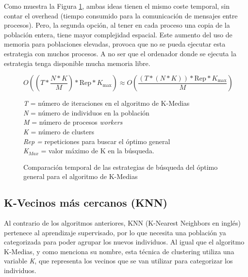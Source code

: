 		Como muestra la Figura \ref{fig:KMedias_comp}, ambas ideas tienen el mismo coste temporal, sin contar el overhead (tiempo consumido para la comunicación de mensajes entre procesos). Pero, la segunda opción, al tener en cada proceso una copia de la población entera, tiene mayor complejidad espacial. Este aumento del uso de memoria para poblaciones elevadas, provoca que no se pueda ejecutar esta estrategia con muchos procesos. A no ser que el ordenador donde se ejecuta la estrategia tenga disponible mucha memoria libre.
		
		\begin{figure} [!h]
			\begin{mdframed}[roundcorner=5pt]
				\[
				O\left((T * \frac{N * K}{M}) * \text{Rep} * K_{\text{max}}\right) \approx O\left(\frac{{(T * (N * K)) * \text{Rep} * K_{\text{max}}}}{{M}}\right)
				\]
				
				
				
				\begin{tcolorbox}[boxrule=0.5pt, fontupper=\small]
					
					\textit{T} = número de iteraciones en el algoritmo de K-Medias\\
					\textit{N} = número de individuos en la población\\
					\textit{M} = número de procesos \textit{workers}\\
					\textit{K} = número de clusters\\
					\textit{Rep = }repeticiones para buscar el óptimo general\\
					\textit{K\(_{Max}\)} = valor máximo de K en la búsqueda.				
					
				\end{tcolorbox}
				
			\end{mdframed}
			\caption{Comparación temporal de las estrategias de búsqueda del óptimo general para el algoritmo de K-Medias}
			\label{fig:KMedias_comp}
		\end{figure}
		
		
		
		
	\subsection{K-Vecinos más cercanos (KNN)}
	\label{cap:3_2_3}
		Al contrario de los algoritmos anteriores, KNN (K-Nearest Neighbors en inglés) pertenece al aprendizaje supervisado, por lo que necesita una población ya categorizada para poder agrupar los nuevos individuos. Al igual que el algoritmo K-Medias, y como menciona su nombre, esta técnica de clustering utiliza una variable \textit{K}, que representa los vecinos que se van utilizar para categorizar los individuos.
		

